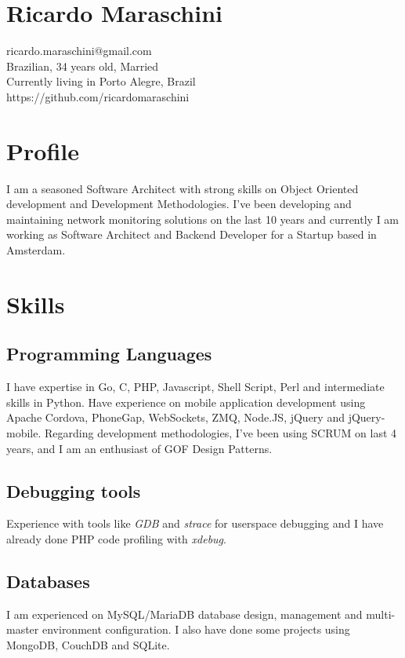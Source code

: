 \documentclass{article}
\begin{document}
\begin{multicols}{2}

\section{Ricardo Maraschini}
ricardo.maraschini@gmail.com\\
Brazilian, 34 years old, Married\\
Currently living in Porto Alegre, Brazil\\
https://github.com/ricardomaraschini

\section{Profile}
I am a seasoned Software Architect with strong skills on Object Oriented
development and Development Methodologies. I've been developing and maintaining
network monitoring solutions on the last 10 years and currently I am
working as Software Architect and Backend Developer for a Startup based in
Amsterdam.

\section{Skills}
\subsection{Programming Languages}
I have expertise in Go, C, PHP, Javascript, Shell Script, Perl and intermediate
skills in Python. Have experience on mobile application development using Apache 
Cordova, PhoneGap, WebSockets, ZMQ, Node.JS, jQuery and jQuery-mobile. Regarding
development methodologies, I've been using SCRUM on last 4 years, and I am an 
enthusiast of GOF Design Patterns.

\subsection{Debugging tools}
Experience with tools like \textit{GDB} and \textit{strace} for userspace 
debugging and I have already done PHP code profiling with \textit{xdebug}.

\subsection{Databases}
I am experienced on MySQL/MariaDB database design, management and multi-master
environment configuration. I also have done some projects using MongoDB, CouchDB
and SQLite.


\end{multicols}
\end{document}

